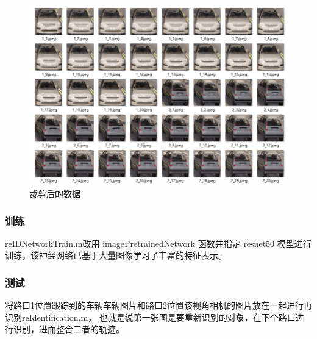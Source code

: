 \begin{figure}[htbp] %
	\centering
	\includegraphics[width=1\textwidth]{p14} %
	\caption{裁剪后的数据} %
	\label{fig:p14} %
\end{figure}




\subsubsection{训练}
reIDNetworkTrain.m改用 imagePretrainedNetwork 函数并指定 resnet50 模型进行训练，该神经网络已基于大量图像学习了丰富的特征表示。
\subsubsection{测试}
将路口1位置跟踪到的车辆车辆图片和路口2位置该视角相机的图片放在一起进行再识别reIdentification.m， 也就是说第一张图是要重新识别的对象，在下个路口进行识别，进而整合二者的轨迹。







